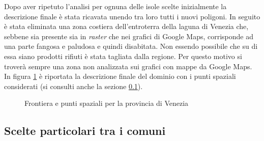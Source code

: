 \documentclass[a4paper,11pt,twoside,openright]{book}							%
\begin{document}
Dopo aver ripetuto l'analisi per ognuna delle isole scelte inizialmente la descrizione finale è stata ricavata unendo tra loro tutti i nuovi poligoni. In seguito è stata eliminata una zona costiera dell'entroterra della laguna di Venezia che, sebbene sia presente sia in \textit{raster} che nei grafici di Google Maps, corrisponde ad una parte fangosa e paludosa e quindi disabitata. Non essendo possibile che su di essa siano prodotti rifiuti è stata tagliata dalla regione. Per questo motivo si troverà sempre una zona non analizzata sui grafici con mappe da Google Maps. In figura \ref{fig:Ven_rgm} è riportata la descrizione finale del dominio con i punti spaziali considerati (si consulti anche la sezione \ref{sez:comunireplicati}).
\begin{figure}[t]
\centering
{}
\caption{Frontiera e punti spaziali per la provincia di Venezia}
\label{fig:Ven_rgm}
\end{figure}

\subsection{Scelte particolari tra i comuni}
\label{sez:comunireplicati}
\end{document}
